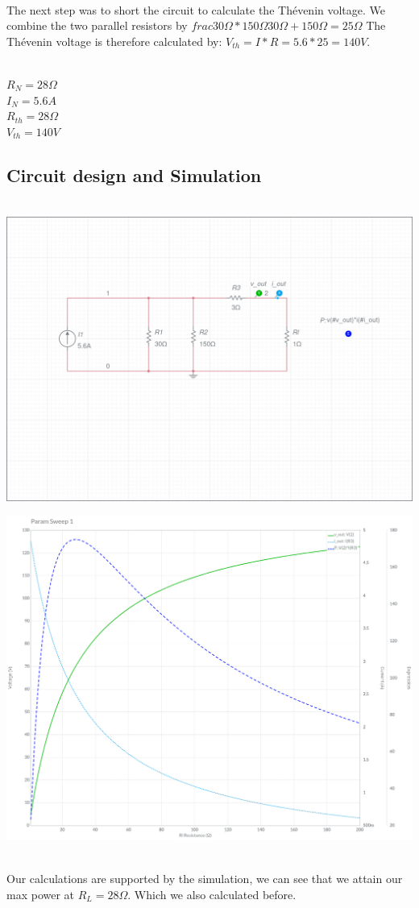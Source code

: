 \documentclass[11pt]{article}
\begin{document}
\noindent
\\
The next step was to short the circuit to calculate the Thévenin voltage. We combine the two parallel resistors by $frac{30\Omega * 150\Omega}{30\Omega + 150\Omega = 25\Omega}$
The Thévenin voltage is therefore calculated by: $V_{th} = I * R = 5.6 * 25 = 140V$.

\noindent
\\
$R_{N} = 28\Omega$
\noindent
\\
$I_{N} = 5.6A$
\noindent
\\
$R_{th} = 28\Omega$
\noindent
\\
$V_{th} = 140V$

\subsection[25pt]{\bf{Circuit design and Simulation}}

\noindent
\\
\includegraphics[width=\linewidth]{circuits/Lab 1 Task 6-schematic.png}

\includegraphics[width=\linewidth]{circuits/Lab 1 Task 6-Grapher.png}

\noindent
\\
Our calculations are supported by the simulation, we can see that we attain our max power at $R_{L} = 28\Omega$. Which we also calculated before.
\end{document}
